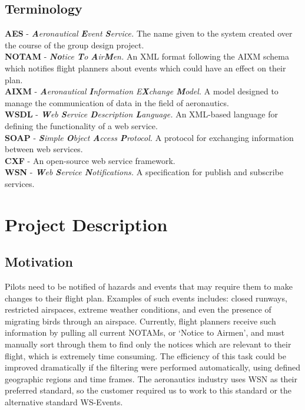 \documentclass[a4paper, 12pt, twoside]{article}
\begin{document}
\subsection{Terminology}
\label{sec:terminology}
\textbf{AES} - \textit{\textbf{A}eronautical \textbf{E}vent \textbf{S}ervice.} The name given to the system created over the course of the group design project.
\\
\textbf{NOTAM} - \textit{\textbf{No}tice \textbf{T}o \textbf{A}ir\textbf{M}en.} An XML format following the AIXM schema which notifies flight planners about events which could have an effect on their plan.
\\
\textbf{AIXM} - \textit{\textbf{A}eronautical \textbf{I}nformation E\textbf{X}change \textbf{M}odel.} A model designed to manage the communication of data in the field of aeronautics.
\\
\textbf{WSDL} - \textit{\textbf{W}eb \textbf{S}ervice \textbf{D}escription \textbf{L}anguage.} An XML-based language for defining the functionality of a web service.
\\
\textbf{SOAP} - \textit{\textbf{S}imple \textbf{O}bject \textbf{A}ccess \textbf{P}rotocol.} A protocol for exchanging information between web services.
\\
\textbf{CXF} - An open-source web service framework.
\\
\textbf{WSN} - \textit{\textbf{W}eb \textbf{S}ervice \textbf{N}otifications.} A specification for publish and subscribe services.

\newpage

\section{Project Description}
\subsection{Motivation}
\label{sec:intro_motivation}
Pilots need to be notified of hazards and events that may require them to make changes to their flight plan. Examples of such events includes: closed runways, restricted airspaces, extreme weather conditions, and even the presence of migrating birds through an airspace. Currently, flight planners receive such information by pulling all current NOTAMs, or `Notice to Airmen', and must manually sort through them to find only the notices which are relevant to their flight, which is extremely time consuming. The efficiency of this task could be improved dramatically if the filtering were performed automatically, using defined geographic regions and time frames. The aeronautics industry uses WSN as their preferred standard, so the customer required us to work to this standard or the alternative standard WS-Events.
\end{document}
